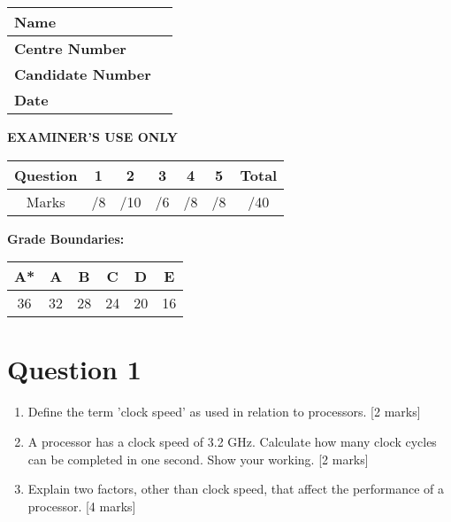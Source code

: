 \documentclass[11pt,a4paper]{article}
\begin{document}
\begin{tabular}{|p{4cm}|p{6cm}|}
\hline
\textbf{Name} & \\ \hline
\textbf{Centre Number} & \\ \hline
\textbf{Candidate Number} & \\ \hline
\textbf{Date} & \\ \hline
\end{tabular}

\vspace{2cm}

\textbf{EXAMINER'S USE ONLY}

\begin{tabular}{|c|c|c|c|c|c|c|}
\hline
Question & 1 & 2 & 3 & 4 & 5 & Total \\ \hline
Marks & /8 & /10 & /6 & /8 & /8 & /40 \\ \hline
\end{tabular}

\vspace{0.5cm}

\textbf{Grade Boundaries:}
\begin{tabular}{|c|c|c|c|c|c|}
\hline
A* & A & B & C & D & E \\ \hline
36 & 32 & 28 & 24 & 20 & 16 \\ \hline
\end{tabular}

\newpage

\section*{Question 1}
\begin{enumerate}[label=(\alph*)]
    \item Define the term 'clock speed' as used in relation to processors. [2 marks]
    
    \vspace{3cm}
    
    \item A processor has a clock speed of 3.2 GHz. Calculate how many clock cycles can be completed in one second. Show your working. [2 marks]
    
    \vspace{3cm}
    
    \item Explain two factors, other than clock speed, that affect the performance of a processor. [4 marks]
    
    \vspace{6cm}
\end{enumerate}
\end{document}
